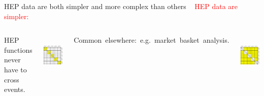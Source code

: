 \documentclass[aspectratio=169]{beamer}
\begin{document}
\begin{frame}{HEP data are both simpler and more complex than others}
\vspace{0.35 cm}
\mbox{ } \hfill \textcolor{red}{\LARGE HEP data are simpler:} \hfill \mbox{ }

\vspace{0.25 cm}
\begin{columns}

HEP functions never have to cross events.

\vspace{0.25 cm}
\mbox{ } \hfill \includegraphics[width=0.8\linewidth]{event-variable-correlation-hep.pdf} \hfill \mbox{ }


\mbox{\hspace{-0.5 cm}Common elsewhere: e.g.\ market basket analysis.\hspace{-0.5 cm}}

\vspace{0.25 cm}
\mbox{ } \hfill \includegraphics[width=0.8\linewidth]{event-variable-correlation-marketbasket-2.pdf} \hfill \mbox{ }

\end{columns}
\end{frame}
\end{document}
